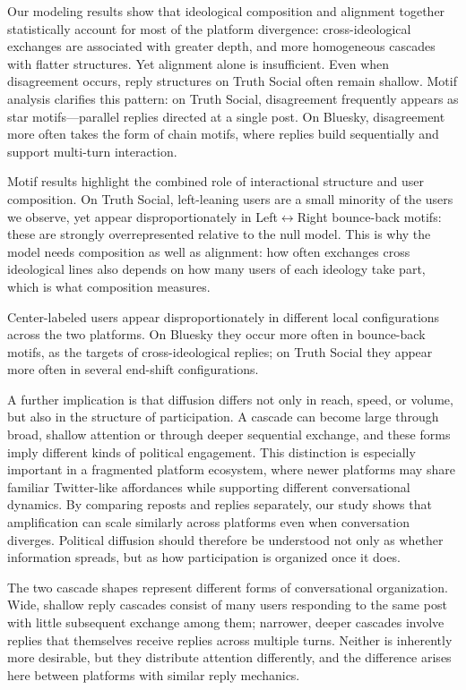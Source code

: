 \documentclass[letterpaper]{article} %
\newcommand{\rev}[1]{{\color{blue}#1}}
\begin{document}
Our modeling results show that ideological composition and alignment together \rev{statistically account for} most of the platform divergence: \rev{cross-ideological exchanges are associated with greater depth, and more homogeneous cascades with flatter structures}. Yet alignment alone is insufficient. Even when disagreement occurs, reply structures on Truth Social often remain shallow. 
Motif analysis clarifies this pattern: on Truth Social, disagreement frequently appears as star motifs---parallel replies directed at a single post. On Bluesky, disagreement more often takes the form of chain motifs, where replies build sequentially and support multi-turn interaction.

Motif results highlight the combined role of interactional structure and user composition. On Truth Social, \rev{left-leaning users are a small minority of the users we observe}, yet appear disproportionately in Left$\leftrightarrow$Right bounce-back motifs: these are strongly overrepresented relative to the null model. \rev{This is why the model needs composition as well as alignment: how often exchanges cross ideological lines also depends on how many users of each ideology take part, which is what composition measures.}

\rev{Center-labeled users appear disproportionately in different local configurations across the two platforms. On Bluesky they occur more often in bounce-back motifs, as the targets of cross-ideological replies; on Truth Social they appear more often in several end-shift configurations.}

\rev{A further implication is that diffusion differs not only in reach, speed, or volume, but also in the structure of participation.} A cascade can become large through broad, shallow attention or through deeper sequential exchange, and these forms imply different kinds of political engagement. This distinction is especially important in a fragmented platform ecosystem, where newer platforms may share familiar Twitter-like affordances while supporting different conversational dynamics. By comparing reposts and replies separately, our study shows that amplification can scale similarly across platforms even when conversation diverges. Political diffusion should therefore be understood not only as whether information spreads, but as how participation is organized once it does.

\rev{The two cascade shapes represent different forms of conversational organization. Wide, shallow reply cascades consist of many users responding to the same post with little subsequent exchange among them; narrower, deeper cascades involve replies that themselves receive replies across multiple turns. Neither is inherently more desirable, but they distribute attention differently, and the difference arises here between platforms with similar reply mechanics.}
\end{document}
